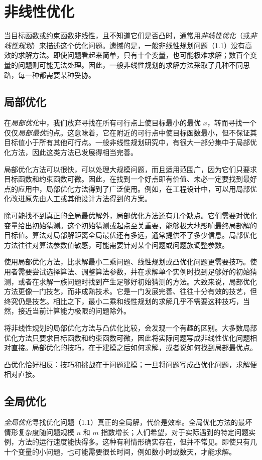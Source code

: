 \section{非线性优化}
当目标函数或约束函数非线性，且不知道它们是否凸时，通常用\emph{非线性优化}（或\emph{非线性规划}）来描述这个优化问题。遗憾的是，一般非线性规划问题（1.1）没有高效的求解方法。即使问题看起来简单，只有十个变量，也可能极难求解；数百个变量的问题则可能无法处理。因此，一般非线性规划的求解方法采取了几种不同思路，每一种都需要某种妥协。

\subsection{局部优化}
在\emph{局部优化}中，我们放弃寻找在所有可行点上使目标最小的最优 $x$，转而寻找一个仅仅\emph{局部最优}的点。这意味着，它在附近的可行点中使目标函数最小，但不保证其目标值小于所有其他可行点。一般非线性规划研究中，有很大一部分集中于局部优化方法，因此这类方法已发展得相当完善。

局部优化方法可以很快，可以处理大规模问题，而且适用范围广，因为它们只要求目标函数和约束函数可微。因此，在找到一个好点即有价值、未必一定要找到最好点的应用中，局部优化方法得到了广泛使用。例如，在工程设计中，可以用局部优化改进原先由人工或其他设计方法得到的方案。

除可能找不到真正的全局最优解外，局部优化方法还有几个缺点。它们需要对优化变量给出初始猜测。这个初始猜测或起点至关重要，能够极大地影响最终局部解的目标值。算法对局部解距离全局最优还有多远，通常提供不了多少信息。局部优化方法往往对算法参数值敏感，可能需要针对某个问题或问题族调整参数。

使用局部优化方法，比求解最小二乘问题、线性规划或凸优化问题更需要技巧。使用者需要尝试选择算法、调整算法参数，并在求解单个实例时找到足够好的初始猜测，或者在求解一族问题时找到产生足够好初始猜测的方法。大致来说，局部优化方法更像一门技艺，而非成熟技术。它是一门发展完善、往往十分有效的技艺，但终究仍是技艺。相比之下，最小二乘和线性规划的求解几乎不需要这种技巧，当然，接近当前计算能力极限的问题除外。

将非线性规划的局部优化方法与凸优化比较，会发现一个有趣的区别。大多数局部优化方法只要求目标函数和约束函数可微，因此将实际问题写成非线性优化问题相对直接。局部优化的技巧，在于建模之后如何求解，或者说如何找到局部最优点。

凸优化恰好相反：技巧和挑战在于问题建模；一旦将问题写成凸优化问题，求解便相对直接。

\subsection{全局优化}
\emph{全局优化}寻找优化问题（1.1）真正的全局解，代价是效率。全局优化方法的最坏情形复杂度随问题规模 $n$ 和 $m$ 指数增长；人们希望，对于实际遇到的特定问题实例，方法的运行速度能快得多。这种有利情形确实存在，但并不常见。即使只有几十个变量的小问题，也可能需要很长时间，例如数小时或数天，才能求解。

